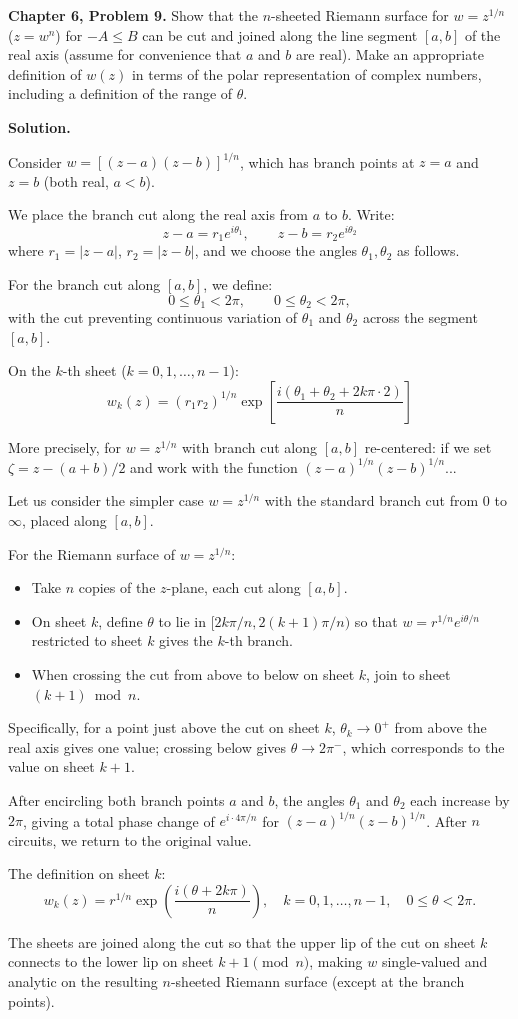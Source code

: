 \documentclass[12pt]{article}
\begin{document}
\textbf{Chapter 6, Problem 9.} Show that the $n$-sheeted Riemann surface for $w = z^{1/n}$ ($z = w^n$) for $-A \leq B$ can be cut and joined along the line segment $[a,b]$ of the real axis (assume for convenience that $a$ and $b$ are real). Make an appropriate definition of $w(z)$ in terms of the polar representation of complex numbers, including a definition of the range of $\theta$.

\bigskip
\textbf{Solution.}

Consider $w = [(z-a)(z-b)]^{1/n}$, which has branch points at $z = a$ and $z = b$ (both real, $a < b$).

We place the branch cut along the real axis from $a$ to $b$. Write:
\[
z - a = r_1 e^{i\theta_1}, \qquad z - b = r_2 e^{i\theta_2}
\]
where $r_1 = |z-a|$, $r_2 = |z-b|$, and we choose the angles $\theta_1, \theta_2$ as follows.

For the branch cut along $[a,b]$, we define:
\[
0 \leq \theta_1 < 2\pi, \qquad 0 \leq \theta_2 < 2\pi,
\]
with the cut preventing continuous variation of $\theta_1$ and $\theta_2$ across the segment $[a,b]$.

On the $k$-th sheet ($k = 0, 1, \ldots, n-1$):
\[
w_k(z) = (r_1 r_2)^{1/n} \exp\!\left[\frac{i(\theta_1 + \theta_2 + 2k\pi \cdot 2)}{n}\right]
\]

More precisely, for $w = z^{1/n}$ with branch cut along $[a,b]$ re-centered: if we set $\zeta = z - (a+b)/2$ and work with the function $(z-a)^{1/n}(z-b)^{1/n}$...

Let us consider the simpler case $w = z^{1/n}$ with the standard branch cut from $0$ to $\infty$, placed along $[a,b]$.

For the Riemann surface of $w = z^{1/n}$:
\begin{itemize}
\item Take $n$ copies of the $z$-plane, each cut along $[a,b]$.
\item On sheet $k$, define $\theta$ to lie in $[2k\pi/n, 2(k+1)\pi/n)$ so that $w = r^{1/n}e^{i\theta/n}$ restricted to sheet $k$ gives the $k$-th branch.
\item When crossing the cut from above to below on sheet $k$, join to sheet $(k+1) \bmod n$.
\end{itemize}

Specifically, for a point just above the cut on sheet $k$, $\theta_k \to 0^+$ from above the real axis gives one value; crossing below gives $\theta \to 2\pi^-$, which corresponds to the value on sheet $k+1$.

After encircling both branch points $a$ and $b$, the angles $\theta_1$ and $\theta_2$ each increase by $2\pi$, giving a total phase change of $e^{i \cdot 4\pi/n}$ for $(z-a)^{1/n}(z-b)^{1/n}$. After $n$ circuits, we return to the original value.

The definition on sheet $k$:
\[
\boxed{w_k(z) = r^{1/n} \exp\!\left(\frac{i(\theta + 2k\pi)}{n}\right), \quad k = 0, 1, \ldots, n-1, \quad 0 \leq \theta < 2\pi.}
\]

The sheets are joined along the cut so that the upper lip of the cut on sheet $k$ connects to the lower lip on sheet $k+1 \pmod{n}$, making $w$ single-valued and analytic on the resulting $n$-sheeted Riemann surface (except at the branch points).
\end{document}
